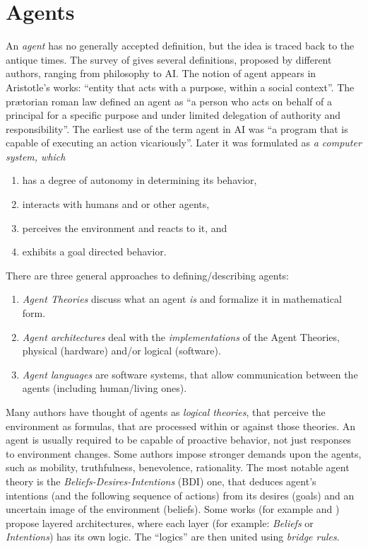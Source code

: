 \documentclass[header]{subfiles}
\begin{document}
\chapter{Agents}
\label{chapter:agents}

An \emph{agent} has no generally accepted definition, but the idea is traced back
to the antique times. The survey of \cite[sec.~2.2]{PNoriega} gives several
definitions, proposed by different authors, ranging from philosophy to AI.
The notion of agent appears in Aristotle's works:
 ``entity that acts with a purpose, within a social context''.
The prætorian roman law defined an agent as
``a person who acts on behalf of a principal for
a specific purpose and under limited delegation of authority and responsibility''.
The earliest use of the term agent in AI was
``a program that is capable of executing an action vicariously''.
Later it was formulated as \emph{a computer system, which}
\begin{enumerate}
  \item has a degree of autonomy in determining its behavior,
  \item interacts with humans and or other agents,
  \item perceives the environment and reacts to it, and
  \item exhibits a goal directed behavior.
\end{enumerate}

\bigskip
\noindent
There are three general approaches to defining/describing agents:
\begin{enumerate}
  \item \emph{Agent Theories} discuss what an agent \emph{is} and formalize
    it in mathematical form.
  \item \emph{Agent architectures} deal with the \emph{implementations}
    of the Agent Theories, physical (hardware) and/or logical (software).
  \item \emph{Agent languages} are software systems, that allow communication
    between the agents (including human/living ones).
\end{enumerate}

\noindent
Many authors have thought of agents as \emph{logical theories}, that perceive
the environment as formulas, that are processed within or against those theories.
An agent is usually required to be capable of proactive behavior, not
just responses to environment changes. Some authors impose stronger demands upon
the agents, such as mobility, truthfulness, benevolence, rationality.
The most notable agent theory is the \emph{Beliefs-Desires-Intentions} (BDI) one,
that deduces agent's intentions (and the following sequence of actions)
from its desires (goals) and an uncertain image of the environment (beliefs).
Some works (for example \cite{UAB-Thesis} and \cite{PNoriega}) propose
layered architectures, where each layer (for example: \emph{Beliefs} or \emph{Intentions})
has its own logic. The ``logics'' are then united using \emph{bridge rules}.
\end{document}
